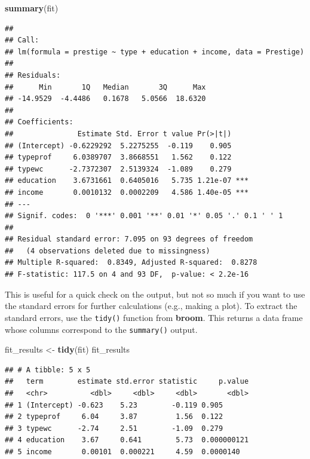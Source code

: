 \documentclass[
  12pt,
  oneside,openany]{book}
\newenvironment{Shaded}{\begin{snugshade}}{\end{snugshade}}
\newcommand{\KeywordTok}[1]{\textcolor[rgb]{0.13,0.29,0.53}{\textbf{#1}}}
\newcommand{\NormalTok}[1]{#1}
\newcommand{\StringTok}[1]{\textcolor[rgb]{0.31,0.60,0.02}{#1}}
\begin{document}
\begin{Shaded}
\begin{Highlighting}[]
\KeywordTok{summary}\NormalTok{(fit)}
\end{Highlighting}
\end{Shaded}

\begin{verbatim}
## 
## Call:
## lm(formula = prestige ~ type + education + income, data = Prestige)
## 
## Residuals:
##      Min       1Q   Median       3Q      Max 
## -14.9529  -4.4486   0.1678   5.0566  18.6320 
## 
## Coefficients:
##               Estimate Std. Error t value Pr(>|t|)    
## (Intercept) -0.6229292  5.2275255  -0.119    0.905    
## typeprof     6.0389707  3.8668551   1.562    0.122    
## typewc      -2.7372307  2.5139324  -1.089    0.279    
## education    3.6731661  0.6405016   5.735 1.21e-07 ***
## income       0.0010132  0.0002209   4.586 1.40e-05 ***
## ---
## Signif. codes:  0 '***' 0.001 '**' 0.01 '*' 0.05 '.' 0.1 ' ' 1
## 
## Residual standard error: 7.095 on 93 degrees of freedom
##   (4 observations deleted due to missingness)
## Multiple R-squared:  0.8349, Adjusted R-squared:  0.8278 
## F-statistic: 117.5 on 4 and 93 DF,  p-value: < 2.2e-16
\end{verbatim}

This is useful for a quick check on the output, but not so much if you want to use the standard errors for further calculations (e.g., making a plot). To extract the standard errors, use the \texttt{tidy()} function from \textbf{broom}. This returns a data frame whose columns correspond to the \texttt{summary()} output.

\begin{Shaded}
\begin{Highlighting}[]
\NormalTok{fit\_results <{-}}\StringTok{ }\KeywordTok{tidy}\NormalTok{(fit)}
\NormalTok{fit\_results}
\end{Highlighting}
\end{Shaded}

\begin{verbatim}
## # A tibble: 5 x 5
##   term        estimate std.error statistic     p.value
##   <chr>          <dbl>     <dbl>     <dbl>       <dbl>
## 1 (Intercept) -0.623    5.23        -0.119 0.905      
## 2 typeprof     6.04     3.87         1.56  0.122      
## 3 typewc      -2.74     2.51        -1.09  0.279      
## 4 education    3.67     0.641        5.73  0.000000121
## 5 income       0.00101  0.000221     4.59  0.0000140
\end{verbatim}
\end{document}

